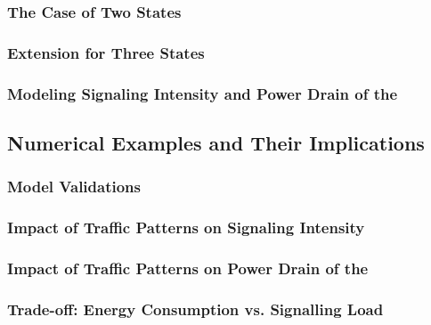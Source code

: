 \subsubsection*{The Case of Two  States}\label{sec:network:performance_model:system_description:two_states}
\subsubsection*{Extension for Three  States}\label{sec:network:performance_model:system_description:three_states}
\subsubsection*{Modeling Signaling Intensity and Power Drain of the }\label{sec:network:performance_model:system_description:metrics}

\subsection{Numerical Examples and Their Implications}\label{sec:network:performance_model:numerical_examples}
\subsubsection*{Model Validations}\label{sec:network:performance_model:validations}
\subsubsection*{Impact of Traffic Patterns on Signaling Intensity}\label{sec:network:performance_model:signaling_intensity}
\subsubsection*{Impact of Traffic Patterns on Power Drain of the }\label{sec:network:performance_model:power_drain}
\subsubsection*{Trade-off: Energy Consumption vs. Signalling Load}\label{sec:network:performance_model:trade_off}
